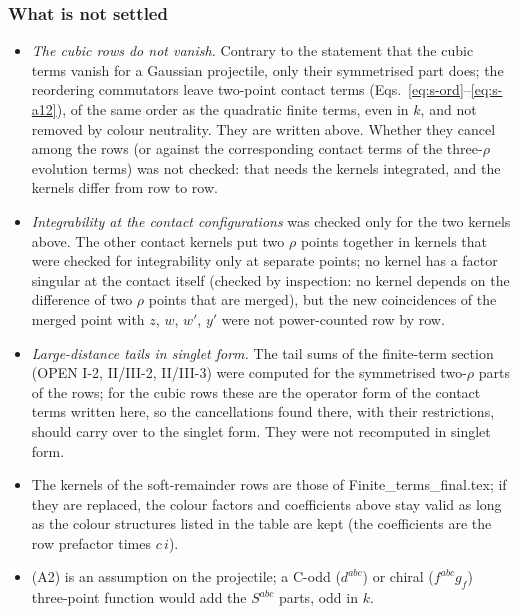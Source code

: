 \documentclass[10pt]{article}
\begin{document}
\subsubsection{What is not settled}
\begin{itemize}
\item[(1)] \emph{The cubic rows do not vanish.} Contrary to the statement that the cubic terms vanish for a Gaussian projectile, only their symmetrised part does; the reordering commutators leave two-point contact terms (Eqs.~\eqref{eq:s-ord}--\eqref{eq:s-a12}), of the same order as the quadratic finite terms, even in $k$, and not removed by colour neutrality. They are written above. Whether they cancel among the rows (or against the corresponding contact terms of the three-$\rho$ evolution terms) was not checked: that needs the kernels integrated, and the kernels differ from row to row.
\item[(2)] \emph{Integrability at the contact configurations} was checked only for the two kernels above. The other contact kernels put two $\rho$ points together in kernels that were checked for integrability only at separate points; no kernel has a factor singular at the contact itself (checked by inspection: no kernel depends on the difference of two $\rho$ points that are merged), but the new coincidences of the merged point with $z$, $w$, $w'$, $y'$ were not power-counted row by row.
\item[(3)] \emph{Large-distance tails in singlet form.} The tail sums of the finite-term section (OPEN I-2, II/III-2, II/III-3) were computed for the symmetrised two-$\rho$ parts of the rows; for the cubic rows these are the operator form of the contact terms written here, so the cancellations found there, with their restrictions, should carry over to the singlet form. They were not recomputed in singlet form.
\item[(4)] The kernels of the soft-remainder rows are those of Finite\_terms\_final.tex; if they are replaced, the colour factors and coefficients above stay valid as long as the colour structures listed in the table are kept (the coefficients are the row prefactor times $c\,i$).
\item[(5)] (A2) is an assumption on the projectile; a C-odd ($d^{abc}$) or chiral ($f^{abc}g_{f}$) three-point function would add the $S^{abc}$ parts, odd in $k$.
\end{itemize}


\end{document}
